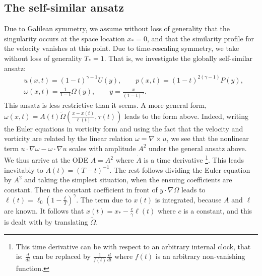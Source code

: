 \documentclass[11pt,reqno]{amsproc}
\numberwithin{equation}{section}
\theoremstyle{remark}
\newcommand{\fr}{\frac}
\newcommand{\na}{\nabla}
\begin{document}
\subsection{The self-similar ansatz}
\label{sec:standing:SS:ass}
Due to Galilean symmetry, we assume without loss of generality that the singularity occurs at the space location $x_*=0$, and 
that the similarity profile for the velocity vanishes at this point.  Due to time-rescaling symmetry, we  take without loss of generality $T_*=1$. 
That is, we investigate the globally self-similar ansatz:
\begin{equation}
\begin{aligned}
&u(x,t) = (1-t)^{\gamma-1} U(y)
, 
\qquad
p(x,t) = (1-t)^{2(\gamma-1)} P(y) 
,
\\
&\omega(x,t) = \frac{1}{1-t} \Omega(y) 
, 
\qquad
y = \frac{x}{(1-t)^\gamma}
.
\end{aligned}
\label{eq:SS:ansatz}
\end{equation}
This ansatz is less restrictive than it seems. A more general form, $\omega (x,t) =
A(t)\widetilde \Omega\left(\fr{x-x(t)}{\ell(t)}, \tau (t)\right)$ leads to the form above. Indeed, writing the Euler equations in vorticity form and using the fact that the velocity and vorticity are related by the linear relation
$\omega = \na\times u$, we see that the nonlinear term $u\cdot\na\omega-\omega\cdot\na u$ scales with amplitude $A^2$ under the general ansatz above. We thus arrive at the ODE $\dot A = A^2$ where $\dot A$ is a time derivative {\footnote{ This time derivative can be with respect to an arbitrary internal clock, that is: $\fr{d}{dt}$ can be replaced by $\fr{1}{f(t)}\fr{d}{dt}$ where $f(t)$ is an arbitrary non-vanishing function.}}. This leads inevitably to $A(t) = (T-t)^{-1}$. The rest follows dividing the Euler equation by $A^2$ and taking the simplest situation, when the ensuing coefficients are constant. Then the constant coefficient in front of $y\cdot\na \Omega$ leads to $\ell(t) = \ell_0\left(1 -\fr{t}{T}\right)^{\gamma}$. The term due to $x(t)$ is integrated, because $A$ and $\ell$ are known. It follows that $x(t) = x_* - \fr{c}{\gamma}\ell(t)$ where $c$ is a constant, and this is dealt with by translating $\widetilde \Omega$.

 
\end{document}
